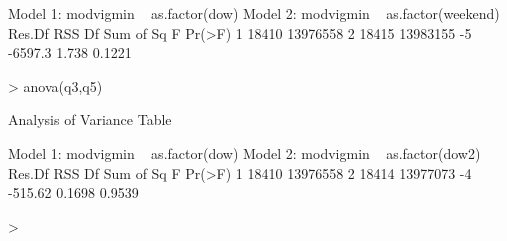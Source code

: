 \documentclass[11pt]{article}
\begin{document}
\begin{Schunk}
\begin{Soutput}
Model 1: modvigmin ~ as.factor(dow)
Model 2: modvigmin ~ as.factor(weekend)
  Res.Df      RSS Df Sum of Sq     F Pr(>F)
1  18410 13976558                          
2  18415 13983155 -5   -6597.3 1.738 0.1221
\end{Soutput}
\begin{Sinput}
> anova(q3,q5)
\end{Sinput}
\begin{Soutput}
Analysis of Variance Table

Model 1: modvigmin ~ as.factor(dow)
Model 2: modvigmin ~ as.factor(dow2)
  Res.Df      RSS Df Sum of Sq      F Pr(>F)
1  18410 13976558                           
2  18414 13977073 -4   -515.62 0.1698 0.9539
\end{Soutput}
\begin{Sinput}
> 
\end{Sinput}
\end{Schunk}
\end{document}
